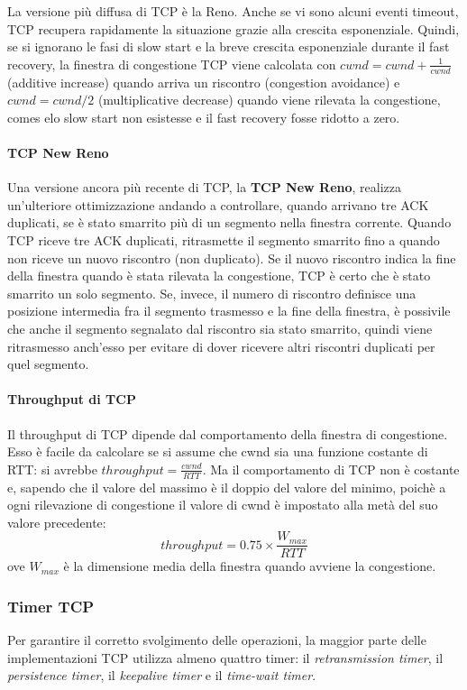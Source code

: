 \documentclass[12pt]{report}
\begin{document}
	La versione più diffusa di TCP è la Reno. Anche se vi sono alcuni eventi timeout, TCP recupera rapidamente la situazione grazie alla crescita esponenziale. Quindi, se si ignorano le fasi di slow start e la breve crescita esponenziale durante il fast recovery, la finestra di congestione TCP viene calcolata con  $cwnd = cwnd + \frac{1}{cwnd}$ (additive increase) quando arriva un riscontro (congestion avoidance) e $cwnd = cwnd/2$ (multiplicative decrease) quando viene rilevata la congestione, comes elo slow start non esistesse e il fast recovery fosse ridotto a zero.

	\paragraph{TCP New Reno}
	Una versione ancora più recente di TCP, la \textbf{TCP New Reno}, realizza un'ulteriore ottimizzazione andando a controllare, quando arrivano tre ACK duplicati, se è stato smarrito più di un segmento nella finestra corrente. Quando TCP riceve tre ACK duplicati, ritrasmette il segmento smarrito fino a quando non riceve un nuovo riscontro (non duplicato). Se il nuovo riscontro indica la fine della finestra quando è stata rilevata la congestione, TCP è certo che è stato smarrito un solo segmento. Se, invece, il numero di riscontro definisce una posizione intermedia fra il segmento trasmesso e la fine della finestra, è possivile che anche il segmento segnalato dal riscontro sia stato smarrito, quindi viene ritrasmesso anch'esso per evitare di dover ricevere altri riscontri duplicati per quel segmento. 

	\paragraph{Throughput di TCP}
	Il throughput di TCP dipende dal comportamento della finestra di congestione. Esso è facile da calcolare se si assume che cwnd sia una funzione costante di RTT: si avrebbe $throughput = \frac{cwnd}{RTT}$. Ma il comportamento di TCP non è costante e, sapendo che il valore del massimo è il doppio del valore del minimo, poichè a ogni rilevazione di congestione il valore di cwnd è impostato alla metà del suo valore precedente:
	\[
		throughput = 0.75 \times \frac{W_{max}}{RTT}
	\]
	ove $W_{max}$ è la dimensione media della finestra quando avviene la congestione.

	\subsubsection{Timer TCP}
	Per garantire il corretto svolgimento delle operazioni, la maggior parte delle implementazioni TCP utilizza almeno quattro timer: il \textit{retransmission timer}, il \textit{persistence timer}, il \textit{keepalive timer} e il \textit{time-wait timer}.
\end{document}
